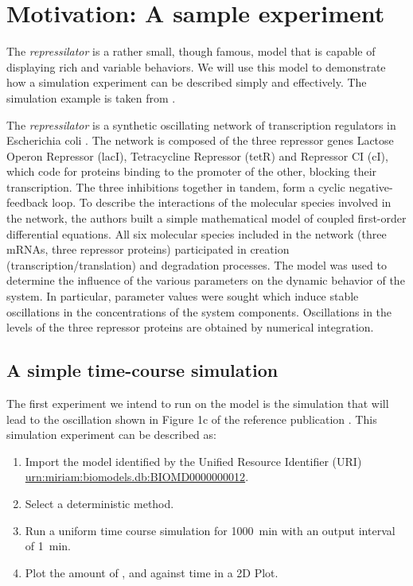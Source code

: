 \section{Motivation: A sample experiment}
\label{motivation:example}

The \emph{repressilator} is a rather small, though famous, model that is capable of displaying rich and variable behaviors. 
We will use this model to demonstrate how a simulation experiment can be described simply and effectively. 
The simulation example is taken from \citet{Waltemath:2011}. 

The \emph{repressilator} is a synthetic oscillating network of transcription regulators in Escherichia coli \citep{Elowitz:2000}. The network is composed of the three repressor genes Lactose Operon Repressor (lacI), Tetracycline Repressor (tetR) and Repressor CI (cI), which code for proteins binding to the promoter of the other, blocking their transcription. The three inhibitions together in tandem, form a cyclic negative-feedback loop. To describe the interactions of the molecular species involved in the network, the authors built a simple mathematical model of coupled first-order differential equations. All six molecular species included in the network (three mRNAs, three repressor proteins) participated in creation (transcription/translation) and degradation processes. The model was used to determine the influence of the various parameters on the dynamic behavior of the system. In particular, parameter values were sought which induce stable oscillations in the concentrations of the system components. Oscillations in the levels of the three repressor proteins are obtained by numerical integration. 

\subsection{A simple time-course simulation}
 \label{sec:intro1}
 The first experiment we intend to run on the model is the simulation that will lead to the oscillation shown in Figure 1c of the reference publication \citep{Elowitz:2000}. This simulation experiment can be described as:

\begin{enumerate}
 	\item{Import the model identified by the Unified Resource Identifier (URI) \citep{Berners-Lee:2005} \url{urn:miriam:biomodels.db:BIOMD0000000012}.}
 	\item {Select a deterministic method.}
 	\item{Run a uniform time course simulation for 1000~min with an output interval of 1~min.}
 	\item{Plot the amount of ,  and  against time in a 2D Plot.}
 \end{enumerate}

